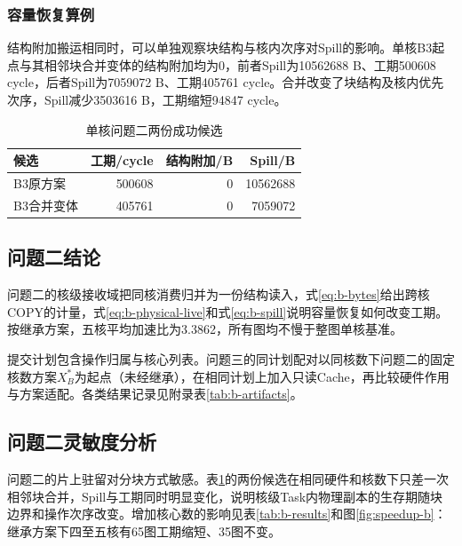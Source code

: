 \subsubsection{容量恢复算例}
结构附加搬运相同时，可以单独观察块结构与核内次序对Spill的影响。单核B3起点与其相邻块合并变体的结构附加均为0，前者Spill为10562688 B、工期500608 cycle，后者Spill为7059072 B、工期405761 cycle。合并改变了块结构及核内优先次序，Spill减少3503616 B，工期缩短94847 cycle。
\begin{table}[H]\centering\caption{单核问题二两份成功候选}\label{tab:b-case008}
\begin{tabular}{lrrr}\toprule
候选 & 工期/cycle & 结构附加/B & Spill/B\\\midrule
B3原方案 & 500608 & 0 & 10562688\\
B3合并变体 & 405761 & 0 & 7059072\\\bottomrule
\end{tabular}\end{table}

\subsection{问题二结论}
问题二的核级接收域把同核消费归并为一份结构读入，式\eqref{eq:b-bytes}给出跨核COPY的计量，式\eqref{eq:b-physical-live}和式\eqref{eq:b-spill}说明容量恢复如何改变工期。按继承方案，五核平均加速比为3.3862，所有图均不慢于整图单核基准。

提交计划包含操作归属与核心列表。问题三的同计划配对以同核数下问题二的固定核数方案$X_B^*$为起点（未经继承），在相同计划上加入只读Cache，再比较硬件作用与方案适配。各类结果记录见附录表\ref{tab:b-artifacts}。

\subsection{问题二灵敏度分析}
问题二的片上驻留对分块方式敏感。表\ref{tab:b-case008}的两份候选在相同硬件和核数下只差一次相邻块合并，Spill与工期同时明显变化，说明核级Task内物理副本的生存期随块边界和操作次序改变。增加核心数的影响见表\ref{tab:b-results}和图\ref{fig:speedup-b}：继承方案下四至五核有65图工期缩短、35图不变。
